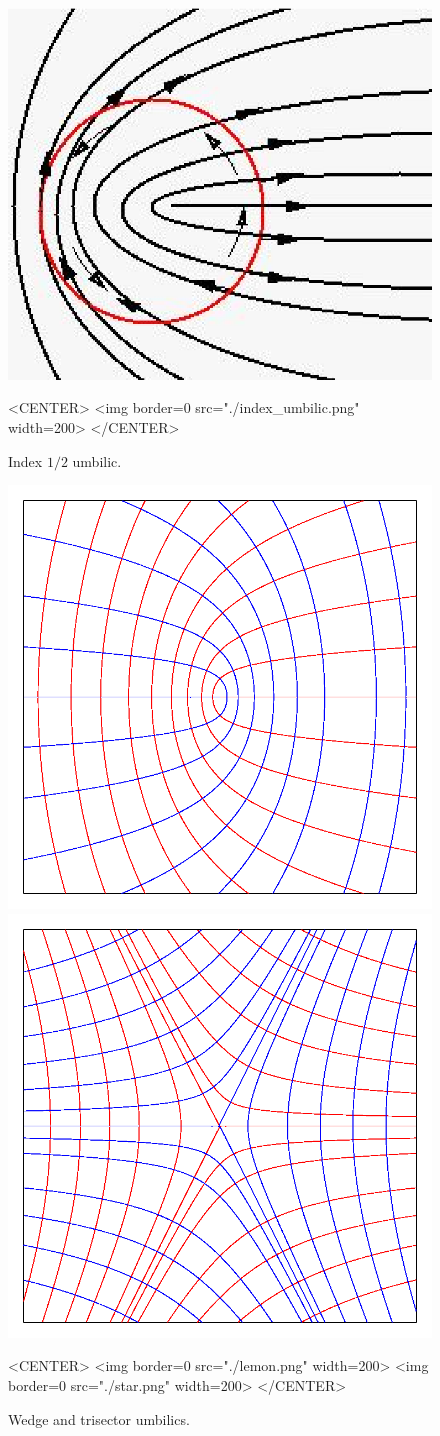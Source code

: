 \begin{figure}[!ht]
\begin{ccTexOnly}
\centerline{
\includegraphics[width=.5\linewidth]{Ridges_3/index_umbilic}}
\end{ccTexOnly}
\caption{Index $1/2$ umbilic.}
\label{index_umbilic}
\begin{ccHtmlOnly}
<CENTER> <img border=0 src="./index_umbilic.png" width=200>
</CENTER>
\end{ccHtmlOnly}
\end{figure}


\begin{figure}[!ht]
\begin{ccTexOnly}
\centerline{
\includegraphics[width=.3\linewidth]{Ridges_3/lemon}
\includegraphics[width=.3\linewidth]{Ridges_3/star}}
\end{ccTexOnly}
\caption{Wedge and trisector umbilics.}
\label{umbilics}
\begin{ccHtmlOnly}
<CENTER> <img border=0 src="./lemon.png" width=200>
 <img border=0 src="./star.png" width=200>
</CENTER>
\end{ccHtmlOnly}
\end{figure}




